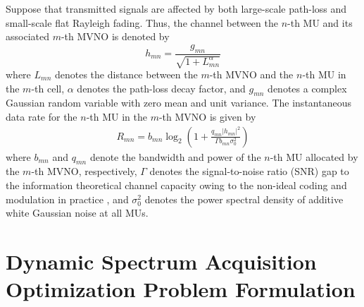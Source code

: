 \documentclass[journal]{IEEEtran}
\begin{document}
 Suppose that transmitted signals are affected by both large-scale {\color{red}path-loss} and small-scale flat Rayleigh fading. Thus, the channel between the $n$-th MU and its associated $m$-th MVNO is denoted by
\begin{equation}
h_{mn}=\frac{g_{mn}}{\sqrt{1+L_{mn}^\alpha}}
\end{equation}
where $L_{mn}$ denotes the distance between the $m$-th MVNO and the $n$-th MU in the $m$-th cell, $\alpha$ denotes the path-loss decay factor, and $g_{mn}$ denotes a complex Gaussian random variable with zero mean and unit variance. The instantaneous data rate for the $n$-th MU in the $m$-th MVNO is given by
\begin{align}
R_{mn} = b_{mn}\log_2\left(1+\frac{q_{mn}\left|h_{mn}\right|^2 }{\Gamma b_{mn}\sigma_0^2}\right)
\end{align}
where $b_{mn}$ and $q_{mn}$ denote the bandwidth and power of the $n$-th MU allocated by the $m$-th MVNO, respectively, $\Gamma$ denotes the signal-to-noise ratio (SNR) gap to the information theoretical channel capacity owing to the non-ideal coding and modulation in practice \cite{JGDForney}, and $\sigma_0^2$ denotes the power spectral density of additive white Gaussian noise at all MUs.


\section{Dynamic Spectrum Acquisition Optimization Problem Formulation}
\end{document}
